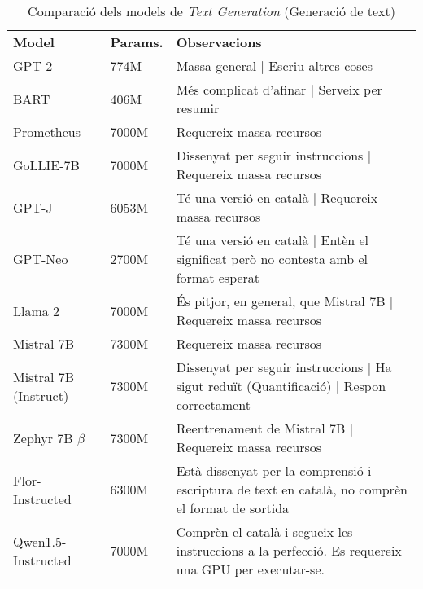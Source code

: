 \begin{table}[H]
    \centering
    \begin{tabular}{|>{\centering}m{2.3cm}|m{1.6cm}|m{10.7cm}|}
        \hline
        \multicolumn{3}{|c|}{\textbf{Models de \textit{Text Generation}}} \\
        \hline
        \textbf{Model} & \textbf{Params.} & \textbf{Observacions} \\
        \hline
        GPT-2 & 774M & Massa general | Escriu altres coses \\
        BART & 406M & Més complicat d'afinar | Serveix per resumir \\
        Prometheus & 7000M & Requereix massa recursos \\
        GoLLIE-7B & 7000M & Dissenyat per seguir instruccions | Requereix massa recursos \\
        GPT-J & 6053M & Té una versió en català | Requereix massa recursos \\
        GPT-Neo & 2700M & Té una versió en català | Entèn el significat però no contesta amb el format esperat \\
        Llama 2 & 7000M & És pitjor, en general, que Mistral 7B | Requereix massa recursos \\
        Mistral 7B & 7300M & Requereix massa recursos \\
        Mistral 7B (Instruct) & 7300M & Dissenyat per seguir instruccions | Ha sigut reduït (Quantificació) | Respon correctament \\
        Zephyr 7B $\beta$ & 7300M & Reentrenament de Mistral 7B | Requereix massa recursos \\
        Flor-Instructed & 6300M & Està dissenyat per la comprensió i escriptura de text en català, no comprèn el format de sortida \\
        Qwen1.5-Instructed & 7000M & Comprèn el català i segueix les instruccions a la perfecció. Es requereix una GPU per executar-se. \\
        \hline
    \end{tabular}
    \caption{Comparació dels models de \textit{Text Generation} (Generació de text)}
    \label{tab:tg-comparison}
\end{table}


